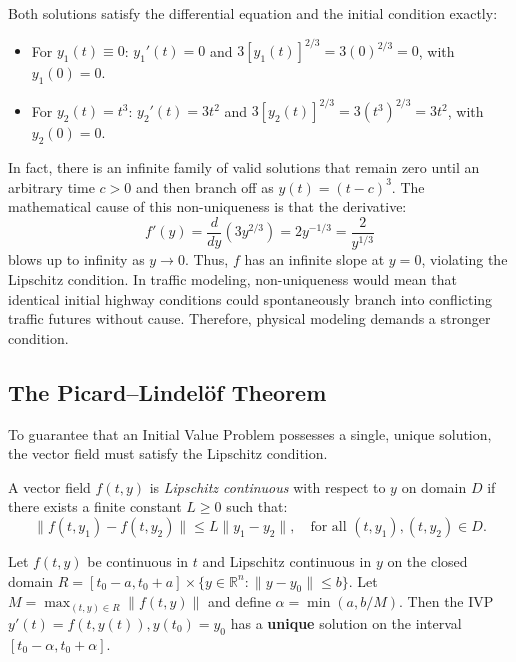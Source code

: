 \documentclass[runningheads]{llncs}
\begin{document}
Both solutions satisfy the differential equation and the initial condition exactly:
\begin{itemize}
    \item For $y_1(t) \equiv 0$: $y_1'(t) = 0$ and $3 [y_1(t)]^{2/3} = 3(0)^{2/3} = 0$, with $y_1(0) = 0$.
    \item For $y_2(t) = t^3$: $y_2'(t) = 3t^2$ and $3 [y_2(t)]^{2/3} = 3(t^3)^{2/3} = 3t^2$, with $y_2(0) = 0$.
\end{itemize}

In fact, there is an infinite family of valid solutions that remain zero until an arbitrary time $c > 0$ and then branch off as $y(t) = (t - c)^3$. The mathematical cause of this non-uniqueness is that the derivative:
\begin{equation}
f'(y) = \frac{d}{dy}\left(3 y^{2/3}\right) = 2 y^{-1/3} = \frac{2}{y^{1/3}}
\end{equation}
blows up to infinity as $y \to 0$. Thus, $f$ has an infinite slope at $y = 0$, violating the Lipschitz condition. In traffic modeling, non-uniqueness would mean that identical initial highway conditions could spontaneously branch into conflicting traffic futures without cause. Therefore, physical modeling demands a stronger condition.

\subsection{The Picard--Lindel\"of Theorem}
To guarantee that an Initial Value Problem possesses a single, unique solution, the vector field must satisfy the Lipschitz condition.

\begin{definition}
A vector field $f(t, y)$ is \emph{Lipschitz continuous} with respect to $y$ on domain $D$ if there exists a finite constant $L \ge 0$ such that:
\begin{equation}
\label{eq:lipschitz_def}
\| f(t, y_1) - f(t, y_2) \| \le L \| y_1 - y_2 \|, \quad \text{for all } (t, y_1), (t, y_2) \in D.
\end{equation}
\end{definition}

\begin{theorem}
\label{thm:picard}
Let $f(t, y)$ be continuous in $t$ and Lipschitz continuous in $y$ on the closed domain $R = [t_0 - a, t_0 + a] \times \{y \in \mathbb{R}^n : \|y - y_0\| \le b\}$. Let $M = \max_{(t, y) \in R} \|f(t, y)\|$ and define $\alpha = \min(a, b/M)$. Then the IVP $y'(t) = f(t, y(t)), y(t_0) = y_0$ has a \textbf{unique} solution on the interval $[t_0 - \alpha, t_0 + \alpha]$.
\end{theorem}
\end{document}
